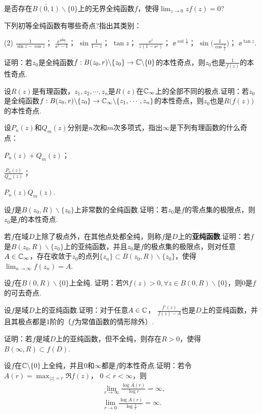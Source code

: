 \begin{xiti}
  \item 是否存在$\bar{B(0,1)}\backslash\{0\}$上的无界全纯函数$f$，使得$\lim_{z\to0}zf(z)=0$?
  \item 下列初等全纯函数有哪些奇点?指出其类别：
    \begin{tasks}(2)
      \task $\frac1{\sin z-\cos z}$；
      \task $\frac{\ee^{\frac1{1-z}}}{\ee^z-1}$；
      \task $\sin\frac1{1-z}$；
      \task $\tan z$；
      \task $\frac{\ee^z}{z(1-\ee^z)}$；
      \task $\ee^{\cot\frac1z}$；
      \task $\sin\bigg(\frac1{\cos\frac1z}\bigg)$；
      \task $\ee^{\tan z}$.
    \end{tasks}
  \item 证明：若$z_0$是全纯函数$f:B(z_0,r)\backslash\{z_0\}\to\mathbb C\backslash\{0\}$的本性奇点，则$z_0$也是$\frac1{f(z)}$的本性奇点.
  \item 设$R(z)$是有理函数，$z_1,z_2,\cdots,z_n$是$R(z)$在$\mathbb C_\infty$上的全部不同的极点.证明：若$z_0$是全纯函数$f:B(z_0,r)\backslash\{z_0\}\to\mathbb C_\infty\backslash
    \{z_1,\cdots,z_n\}$的本性奇点，则$z_0$也是$R\big(f(z)\big)$的本性奇点.
  \item 设$P_n(z)$和$Q_m(z)$分别是$n$次和$m$次多项式，指出$\infty$是下列有理函数的什么奇点：
    \begin{enuma}
      \item $P_n(z)+Q_m(z)$；
      \item $\frac{P_n(z)}{Q_m(z)}$；
      \item $P_n(z)Q_m(z)$.
    \end{enuma}
  \item 设$f$是$B(z_0,R)\backslash\{z_0\}$上非常数的全纯函数.证明：若$z_0$是$f$的零点集的极限点，则$z_0$是$f$的本性奇点.
  \item 若$f$在域$D$上除了极点外，在其他点处都全纯，则称$f$是$D$上的\textbf{亚纯函数}.证明：若$f$是$B(z_0,R)\backslash\{z_0\}$上的亚纯函数，并且$z_0$是$f$的极点集的极限点，则对任意$A\in \mathbb C_\infty$，存在收敛于$z_0$的点列$\{z_n\}\subset B(z_0,R)\backslash\{z_0\}$，使得$\lim_{n\to\infty}f(z_n)=A$.
  \item 设$f$在$B(0,R)\backslash\{0\}$上全纯. 证明：若$\Re f(z)>0,\forall z\in B(0,R)\backslash\{0\}$，则$0$是$f$的可去奇点.
  \item 设$f$是域$D$上的亚纯函数.证明：对于任意$A\in \mathbb C$，
      $\frac{f'(z)}{f(z)-A}$也是$D$上的亚纯函数，并且其极点都是$1$阶的（$f$为常值函数的情形除外）.
  \item 证明：若$f$是域$D$上的亚纯函数，但不全纯，则存在$R>0$，使得$B(\infty,R)\subset f(D)$.
  \item 设$f$在$\mathbb C\backslash\{0\}$上全纯，并且$0$和$\infty$都是$f$的本性奇点.证明：若令$A(r)=\max_{|z|=r}\Re f(z)$， $0<r<\infty$，则
      \begin{align*}
        & \lim_{r\to\infty}\frac{\log A(r)}{\log r} = \infty,\\
        & \lim_{r\to0}\frac{\log A(r)}{\log\frac1r} = \infty.
      \end{align*}
\end{xiti}

